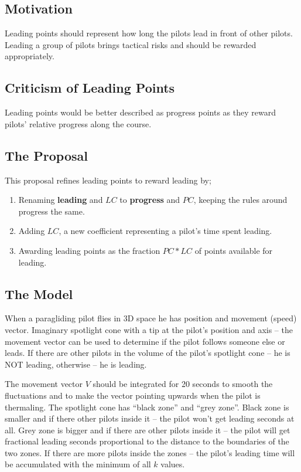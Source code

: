 \documentclass[gap.tex]{subfiles}
\begin{document}
\label{sec:real-leading}

\subsection{Motivation}
Leading points should represent how long the pilots lead in front of other
pilots. Leading a group of pilots brings tactical risks and should be rewarded
appropriately.

\subsection{Criticism of Leading Points}
Leading points would be better described as progress points as they reward
pilots' relative progress along the course.

\subsection{The Proposal}
This proposal refines leading points to reward leading by;

\begin{enumerate}
    \item Renaming \textbf{leading} and \(LC\) to \textbf{progress} and \(PC\),
        keeping the rules around progress the same.

    \item Adding \(LC\), a new coefficient representing a pilot's time spent
        leading.

    \item Awarding leading points as the fraction \(PC * LC\) of points
        available for leading.
\end{enumerate}

\subsection{The Model}
When a paragliding pilot flies in 3D space he has position and movement (speed)
vector. Imaginary spotlight cone with a tip at the pilot’s position and axis
– the movement vector can be used to determine if the pilot follows someone
else or leads. If there are other pilots in the volume of the pilot’s spotlight
cone – he is NOT leading, otherwise – he is leading.

The movement vector \(V\) should be integrated for 20 seconds to smooth the
fluctuations and to make the vector pointing upwards when the pilot is
thermaling. The spotlight cone has “black zone” and “grey zone”. Black zone is
smaller and if there other pilots inside it – the pilot won’t get leading
seconds at all. Grey zone is bigger and if there are other pilots inside it
– the pilot will get fractional leading seconds proportional to the distance to
the boundaries of the two zones. If there are more pilots inside the zones
– the pilot’s leading time will be accumulated with the minimum of all \(k\)
values.
\end{document}
